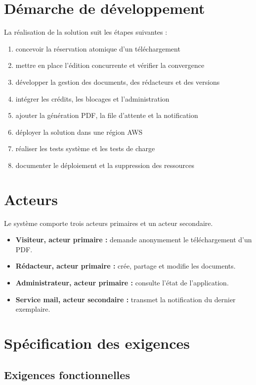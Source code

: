 \section{Démarche de développement}
La réalisation de la solution suit les étapes suivantes :

\begin{enumerate}
\item concevoir la réservation atomique d'un téléchargement
\item mettre en place l'édition concurrente et vérifier la convergence
\item développer la gestion des documents, des rédacteurs et des versions
\item intégrer les crédits, les blocages et l'administration
\item ajouter la génération PDF, la file d'attente et la notification
\item déployer la solution dans une région AWS
\item réaliser les tests système et les tests de charge
\item documenter le déploiement et la suppression des ressources
\end{enumerate}


\section{Acteurs}

Le système comporte trois acteurs primaires et un acteur secondaire.

\begin{itemize}
\item \textbf{Visiteur, acteur primaire :} demande anonymement le téléchargement d'un PDF.
\item \textbf{Rédacteur, acteur primaire :} crée, partage et modifie les documents.
\item \textbf{Administrateur, acteur primaire :} consulte l'état de l'application.
\item \textbf{Service mail, acteur secondaire :} transmet la notification du dernier exemplaire.
\end{itemize}

\section{Spécification des exigences}
\subsection{Exigences fonctionnelles}

